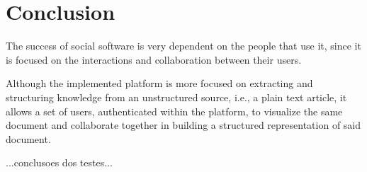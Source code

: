 
\chapter{Conclusion}
\label{chapter:conclusion}

The success of social software is very dependent on the people that use it, since it is focused on the interactions and collaboration between their users.

Although the implemented platform is more focused on extracting and structuring knowledge from an unstructured source, i.e., a plain text article, it allows a set of users, authenticated within the platform, to visualize the same document and collaborate together in building a structured representation of said document.

...conclusoes dos testes...


